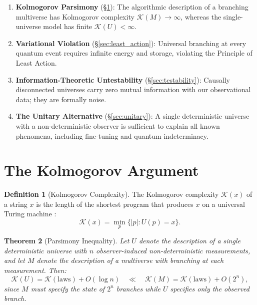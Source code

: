 \documentclass[12pt, a4paper]{article}
\theoremstyle{plain}
\newtheorem{theorem}{Theorem}[section]
\theoremstyle{definition}
\newtheorem{definition}[theorem]{Definition}
\theoremstyle{remark}
\newcommand{\K}{\mathcal{K}}
\begin{document}
\begin{enumerate}
  \item \textbf{Kolmogorov Parsimony} (\S\ref{sec:kolmogorov}): The
    algorithmic description of a branching multiverse has Kolmogorov
    complexity $\K(M) \to \infty$, whereas the single-universe model
    has finite $\K(U) < \infty$.

  \item \textbf{Variational Violation} (\S\ref{sec:least_action}): Universal
    branching at every quantum event requires infinite energy and storage,
    violating the Principle of Least Action.

  \item \textbf{Information-Theoretic Untestability}
    (\S\ref{sec:testability}): Causally disconnected universes carry zero
    mutual information with our observational data; they are formally noise.

  \item \textbf{The Unitary Alternative} (\S\ref{sec:unitary}): A single
    deterministic universe with a non-deterministic observer is sufficient
    to explain all known phenomena, including fine-tuning and quantum
    indeterminacy.
\end{enumerate}

\section{The Kolmogorov Argument}\label{sec:kolmogorov}

\begin{definition}[Kolmogorov Complexity]\label{def:kolmogorov}
  The Kolmogorov complexity $\K(x)$ of a string $x$ is the length of the
  shortest program that produces $x$ on a universal Turing machine
  \citep{Kolmogorov1965, LiVitanyi2008}:
  \begin{equation}
    \K(x) = \min_{p} \{ |p| : U(p) = x \}.
  \end{equation}
\end{definition}

\begin{theorem}[Parsimony Inequality]\label{thm:parsimony}
  Let $U$ denote the description of a single deterministic universe with
  $n$ observer-induced non-deterministic measurements, and let $M$ denote
  the description of a multiverse with branching at each measurement.
  Then:
  \begin{equation}\label{eq:parsimony}
    \K(U) = \K(\text{laws}) + O(\log n)
    \quad \ll \quad
    \K(M) = \K(\text{laws}) + O(2^n),
  \end{equation}
  since $M$ must specify the state of $2^n$ branches while $U$ specifies
  only the observed branch.
\end{theorem}
\end{document}

